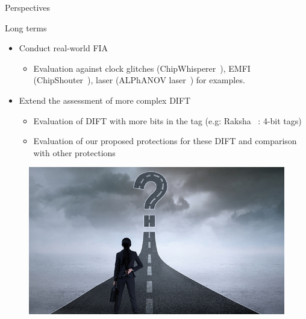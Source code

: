 \begin{frame}{Perspectives}
    \begin{block}{Long terms}
        \begin{itemize}
            [triangle]
            \item Conduct real-world FIA
                \begin{itemize}
                    \item Evaluation against clock glitches (ChipWhisperer~\cite{chipwhisperer}), EMFI (ChipShouter~\cite{chipshouter}), laser (ALPhANOV laser~\cite{alphanov-fourLFI}) for examples.
                \end{itemize}
            \item Extend the assessment of more complex DIFT
                \begin{itemize}
                    \item Evaluation of DIFT with more bits in the tag (e.g: Raksha~\cite{DKK-07-sigarch} : 4-bit tags)
                    \item Evaluation of our proposed protections for these DIFT and comparison with other protections
                \end{itemize}
        \end{itemize}
    \end{block}

    \begin{figure}
        \centering
        \includegraphics[height=.25\textheight]{src/6_conclusion/img/perspectives.jpg}
    \end{figure}
\end{frame}
